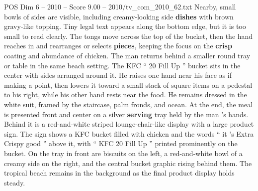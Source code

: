 \begin{textsample}{POS Dim 6 – 2010 – Score 9.00 – 2010/tv\_com\_2010\_62.txt}
Nearby, small bowls of sides are visible, including creamy-looking side \textbf{dishes} with brown gravy-like topping.
Tiny legal text appears along the bottom edge, but it is too small to read clearly.
The tongs move across the top of the bucket, then the hand reaches in and rearranges or selects \textbf{pieces}, keeping the focus on the \textbf{crisp} coating and abundance of chicken.
The man returns behind a smaller round tray or table in the same beach setting.
The KFC “ 20 Fill Up ” bucket sits in the center with sides arranged around it.
He raises one hand near his face as if making a point, then lowers it toward a small stack of square items on a pedestal to his right, while his other hand rests near the food.
He remains dressed in the white suit, framed by the staircase, palm fronds, and ocean.
At the end, the meal is presented front and center on a silver \textbf{serving} tray held by the man ’s hands.
Behind it is a red-and-white striped lounge-chair-like display with a large product sign.
The sign shows a KFC bucket filled with chicken and the words “ it ’s Extra Crispy good ” above it, with “ KFC 20 Fill Up ” printed prominently on the bucket.
On the tray in front are biscuits on the left, a red-and-white bowl of a creamy side on the right, and the central bucket graphic rising behind them.
The tropical beach remains in the background as the final product display holds steady.

\end{textsample}

